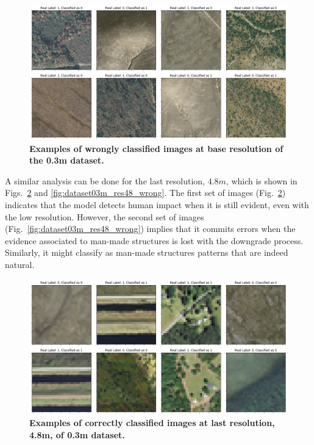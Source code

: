 \begin{figure}[H]
	\centering
	\captionsetup{width=1\linewidth}
	\includegraphics[width=1\textwidth]{Figures/results/class_dataset03m_res03_wrong.png}
	\caption{\textbf{Examples of wrongly classified images at base resolution of the 0.3m dataset.}}
	\label{fig:dataset03m_res03_wrong}
\end{figure}

A similar analysis can be done for the last resolution, $4.8m$, which is shown in Figs.~\ref{fig:dataset03m_res48_correct} and \ref{fig:dataset03m_res48_wrong}. The first set of images (Fig.~\ref{fig:dataset03m_res48_correct}) indicates that the model detects human impact when it is still evident, even with the low resolution. However, the second set of images (Fig.~\ref{fig:dataset03m_res48_wrong}) implies that it commits errors when the evidence associated to man-made structures is lost with the downgrade process. Similarly, it might classify as man-made structures patterns that are indeed natural.

\begin{figure}[H]
	\centering
	\captionsetup{width=1\linewidth}
	\includegraphics[width=1\textwidth]{Figures/results/class_dataset03m_res48_correct.png}
	\caption{\textbf{Examples of correctly classified images at last resolution, 4.8m, of 0.3m dataset.}}
	\label{fig:dataset03m_res48_correct}
\end{figure}

